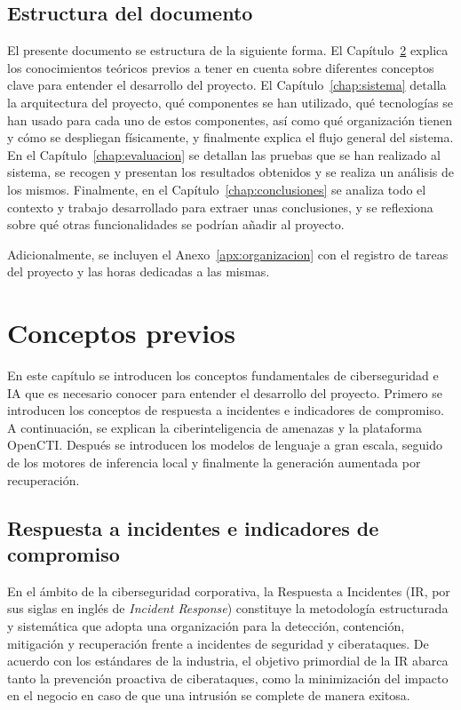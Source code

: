 \documentclass[12pt]{report}
\begin{document}
\section{Estructura del documento}
El presente documento se estructura de la siguiente forma. El Capítulo~\ref{chap:conceptos} explica los conocimientos teóricos previos a tener en cuenta sobre diferentes conceptos clave para entender el desarrollo del proyecto. El Capítulo~\ref{chap:sistema} detalla la arquitectura del proyecto, qué componentes se han utilizado, qué tecnologías se han usado para cada uno de estos componentes, así como qué organización tienen y cómo se despliegan físicamente, y finalmente explica el flujo general del sistema. En el Capítulo~\ref{chap:evaluacion} se detallan las pruebas que se han realizado al sistema, se recogen y presentan los resultados obtenidos y se realiza un análisis de los mismos. Finalmente, en el Capítulo~\ref{chap:conclusiones} se analiza todo el contexto y trabajo desarrollado para extraer unas conclusiones, y se reflexiona sobre qué otras funcionalidades se podrían añadir al proyecto.

Adicionalmente, se incluyen el Anexo~\ref{apx:organizacion} con el registro de tareas del proyecto y las horas dedicadas a las mismas.
\newpage
\chapter{Conceptos previos}
\label{chap:conceptos}
En este capítulo se introducen los conceptos fundamentales de ciberseguridad e IA que es necesario conocer para entender el desarrollo del proyecto. Primero se introducen los conceptos de respuesta a incidentes e indicadores de compromiso. A continuación, se explican la ciberinteligencia de amenazas y la plataforma OpenCTI. Después se introducen los modelos de lenguaje a gran escala, seguido de los motores de inferencia local y finalmente la generación aumentada por recuperación.
\section{Respuesta a incidentes e indicadores de compromiso}

En el ámbito de la ciberseguridad corporativa, la Respuesta a Incidentes (IR, por sus siglas en inglés de \textit{Incident Response}) constituye la metodología estructurada y sistemática que adopta una organización para la detección, contención, mitigación y recuperación frente a incidentes de seguridad y ciberataques. De acuerdo con los estándares de la industria, el objetivo primordial de la IR abarca tanto la prevención proactiva de ciberataques, como la minimización del impacto en el negocio en caso de que una intrusión se complete de manera exitosa. 
\end{document}
